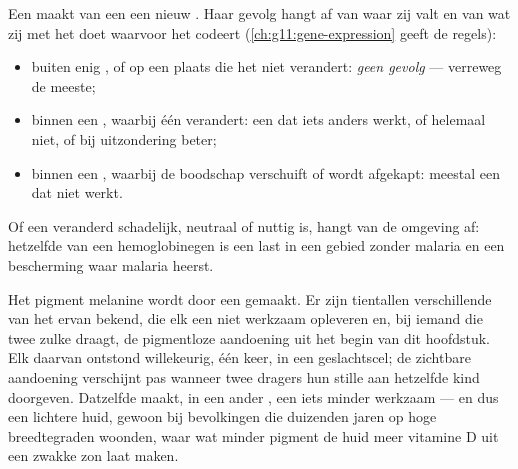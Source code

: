 \begin{proposition}\label{prop:g11:mutations:consequences}
Een  maakt van een  een nieuw . Haar gevolg hangt af van
waar zij valt en van wat zij met het  doet waarvoor het  codeert
(\cref{ch:g11:gene-expression} geeft de regels):
\begin{itemize}
  \item buiten enig , of op een plaats die het  niet verandert:
        \emph{geen gevolg} --- verreweg de meeste;
  \item binnen een , waarbij één  verandert: een  dat
        iets anders werkt, of helemaal niet, of bij uitzondering beter;
  \item binnen een , waarbij de boodschap verschuift of wordt
        afgekapt: meestal een  dat niet werkt.
\end{itemize}
Of een veranderd  schadelijk, neutraal of nuttig is, hangt van de
omgeving af: hetzelfde  van een hemoglobinegen is een last in een
gebied zonder malaria en een bescherming waar malaria heerst.
\end{proposition}
\admitted

\begin{example}\label{ex:g11:mutations:pigment}
Het pigment melanine wordt door een  gemaakt. Er zijn tientallen
verschillende  van het  ervan bekend, die elk een niet
werkzaam  opleveren en, bij iemand die twee zulke  draagt, de
pigmentloze aandoening uit het begin van dit hoofdstuk. Elk daarvan
ontstond willekeurig, één keer, in een geslachtscel; de zichtbare
aandoening verschijnt pas wanneer twee dragers hun stille  aan
hetzelfde kind doorgeven. Datzelfde  maakt, in een ander , een
iets minder werkzaam  --- en dus een lichtere huid, gewoon bij
bevolkingen die duizenden jaren op hoge breedtegraden woonden, waar wat
minder pigment de huid meer vitamine D uit een zwakke zon laat maken.
\end{example}

